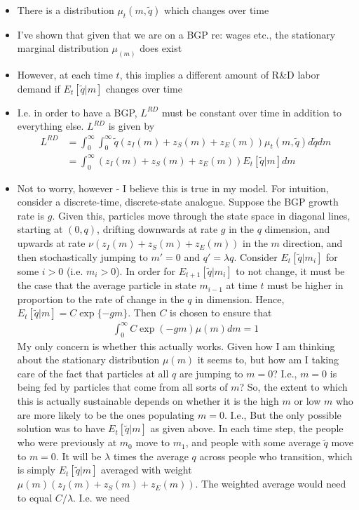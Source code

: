 \documentclass[12pt,english]{article}
\theoremstyle{remark}
\begin{document}
\begin{itemize}
	\item There is a distribution $\mu_t(m,\tilde{q})$ which changes over time
	\item I've shown that given that we are on a BGP re: wages etc., the stationary marginal distribution $\mu_(m)$ does exist
	\item However, at each time $t$, this implies a different amount of R\&D labor demand if $E_t[\tilde{q} | m]$ changes over time
	\item I.e. in order to have a BGP, $L^{RD}$ must be constant over time in addition to everything else. $L^{RD}$ is given by 
	\begin{align*}
		L^{RD} &= \int_0^{\infty} \int_0^{\infty} \tilde{q}(z_I(m) + z_S(m) + z_E(m)) \mu_t(m,\tilde{q}) d\tilde{q} dm \\
		       &= \int_0^{\infty} (z_I(m) + z_S(m) + z_E(m)) E_t[\tilde{q} | m] dm
	\end{align*}
	\item Not to worry, however - I believe this is true in my model. For intuition, consider a discrete-time, discrete-state analogue. Suppose the BGP growth rate is $g$. Given this, particles move through the state space in diagonal lines, starting at $(0,q)$, drifting downwards at rate $g$ in the $q$ dimension, and upwards at rate $\nu(z_I(m) + z_S(m) + z_E(m))$ in the $m$ direction, and then stochastically jumping to $m' = 0$ and $q' = \lambda q$. Consider $E_t[\tilde{q}|m_i]$ for some $i > 0$ (i.e. $m_i > 0$). In order for $E_{t+1}[\tilde{q}|m_i]$ to not change, it must be the case that the average particle in state $m_{i-1}$ at time $t$ must be higher in proportion to the rate of change in the $q$ in dimension. Hence, $E_t[\tilde{q} | m] = C\exp\{ -gm \} $. Then $C$ is chosen to ensure that \begin{align}
		\int_0^{\infty} C\exp(-gm) \mu(m) dm = 1
	\end{align}
	My only concern is whether this actually works. Given how I am thinking about the stationary distribution $\mu(m)$ it seems to, but how am I taking care of the fact that particles at all $q$ are jumping to $m = 0$? I.e., $m=0$ is being fed by particles that come from all sorts of $m$? So, the extent to which this is actually sustainable depends on whether it is the high $m$ or low $m$ who are more likely to be the ones populating $m = 0$. I.e., But the only possible solution was to have $E_t[\tilde{q}|m]$ as given above. In each time step, the people who were previously at $m_0$ move to $m_1$, and people with some average $\tilde{q}$ move to $m=0$. It will be $\lambda$ times the average $q$ across people who transition, which is simply $E_t[\tilde{q}|m]$ averaged with weight $\mu(m) (z_I(m) + z_S(m) + z_E(m))$. The weighted average would need to equal $C/\lambda$.  I.e. we need 

\end{itemize}
\end{document}
